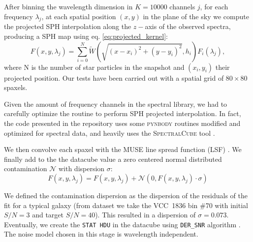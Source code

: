After binning the wavelength dimension in $K=10000$ channels $j$, for each frequency $\lambda_j$, at each spatial position $(x,y)$ in the plane of the sky we compute the projected SPH interpolation along the $z-$axis of the observed spectra, producing a SPH map using eq. \eqref{eq:projected_kernel}:
\begin{equation}
  F(x,y, \lambda_j) = \sum_{i=0}^{N} \tilde{W} \left(\sqrt{(x-x_i)^2+(y-y_i)^2}, h_i \right) F_i(\lambda_j),
\end{equation}
where N is the number of star particles in the snapshot and $(x_i, y_i)$ their projected position.
Our tests have been carried out with a spatial grid of $80\times 80$ spaxels.

Given the amount of frequency channels in the spectral library, we had to carefully optimize the routine to perform SPH projected interpolation.
In fact, the code presented in the repository \citet{simifucube} uses some \textsc{pynbody} \citep{Pontzen2013} routines modified and optimized for spectral data, and heavily uses the \textsc{SpectralCube} tool \citep{SpectralCube}.

We then convolve each spaxel with the MUSE line spread function (LSF) \citep[$F_{\mathrm{udf}10}$, eq. (8) in][]{Bacon2017}.
We finally add to the the datacube value a zero centered normal distributed contamination $\mathcal{N}$ with dispersion $\sigma$:
\begin{equation}
  F(x,y, \lambda_j) = F(x,y, \lambda_j) + \mathcal{N}(0, F(x,y, \lambda_j)\cdot \sigma )
\end{equation}

We defined the contamination dispersion as the dispersion of the residuals of the fit for a typical galaxy (from \citet{Bidaran2020} dataset we take the VCC~1836 bin \#70 with initial $S/N=3$ and target $S/N=40$).
This resulted in a dispersion of $\sigma = 0.073$.
Eventually, we create the \verb|STAT HDU| in the datacube using \verb|DER_SNR| algorithm \citep{Stoehr2008}. The noise model chosen in this stage is wavelength independent.



